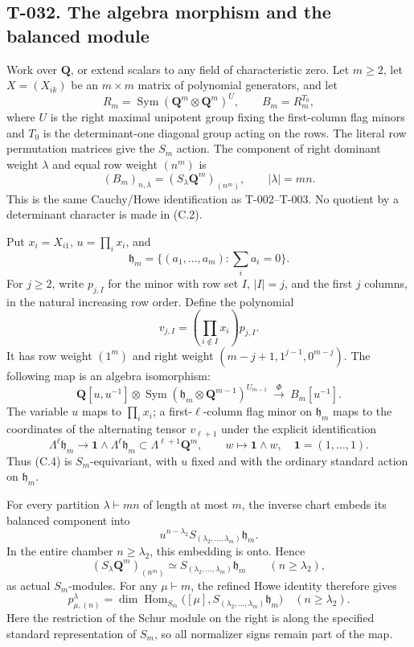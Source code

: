 \documentclass[
  10pt,
]{article}
\begin{document}
\subsection{T-032. The algebra morphism and the balanced
module}\label{t-032.-the-algebra-morphism-and-the-balanced-module}

Work over \(\mathbf Q\), or extend scalars to any field of
characteristic zero. Let \(m\ge2\), let \(X=(X_{ik})\) be an
\(m\times m\) matrix of polynomial generators, and let \[
R_m=\operatorname{Sym}(\mathbf Q^m\otimes\mathbf Q^m)^{U},
\qquad B_m=R_m^{T_0},
\tag{C.1}
\] where \(U\) is the right maximal unipotent group fixing the
first-column flag minors and \(T_0\) is the determinant-one diagonal
group acting on the rows. The literal row permutation matrices give the
\(S_m\) action. The component of right dominant weight \(\lambda\) and
equal row weight \((n^m)\) is \[
(B_m)_{n,\lambda}=(S_\lambda\mathbf Q^m)_{(n^m)},
\qquad |\lambda|=mn.
\tag{C.2}
\] This is the same Cauchy/Howe identification as T-002--T-003. No
quotient by a determinant character is made in (C.2).

Put \(x_i=X_{i1}\), \(u=\prod_i x_i\), and \[
\mathfrak h_m=\{(a_1,\ldots,a_m):\sum_i a_i=0\}.
\] For \(j\ge2\), write \(p_{j,I}\) for the minor with row set \(I\),
\(|I|=j\), and the first \(j\) columns, in the natural increasing row
order. Define the polynomial \[
v_{j,I}=\left(\prod_{i\notin I}x_i\right)p_{j,I}.
\tag{C.3}
\] It has row weight \((1^m)\) and right weight
\((m-j+1,1^{j-1},0^{m-j})\). The following map is an algebra
isomorphism: \[
\boxed{
\mathbf Q[u,u^{-1}]\otimes
\operatorname{Sym}(\mathfrak h_m\otimes\mathbf Q^{m-1})^{U_{m-1}}
\ \xrightarrow{\ \Phi\ }\ B_m[u^{-1}].}
\tag{C.4}
\] The variable \(u\) maps to \(\prod_i x_i\); a first-\(\ell\)-column
flag minor on \(\mathfrak h_m\) maps to the coordinates of the
alternating tensor \(v_{\ell+1}\) under the explicit identification \[
\Lambda^\ell\mathfrak h_m\longrightarrow
\mathbf1\wedge\Lambda^\ell\mathfrak h_m\subset\Lambda^{\ell+1}\mathbf Q^m,
\qquad w\longmapsto\mathbf1\wedge w,
\quad\mathbf1=(1,\ldots,1).
\tag{C.5}
\] Thus (C.4) is \(S_m\)-equivariant, with \(u\) fixed and with the
ordinary standard action on \(\mathfrak h_m\).

For every partition \(\lambda\vdash mn\) of length at most \(m\), the
inverse chart embeds its balanced component into \[
u^{n-\lambda_2}S_{(\lambda_2,\ldots,\lambda_m)}\mathfrak h_m.
\tag{C.6}
\] In the entire chamber \(n\ge\lambda_2\), this embedding is onto.
Hence \[
\boxed{
(S_\lambda\mathbf Q^m)_{(n^m)}
\simeq S_{(\lambda_2,\ldots,\lambda_m)}\mathfrak h_m
\qquad(n\ge\lambda_2),}
\tag{C.7}
\] as actual \(S_m\)-modules. For any \(\mu\vdash m\), the refined Howe
identity therefore gives \[
\boxed{
p_{\mu,(n)}^\lambda
=\dim\operatorname{Hom}_{S_m}
\bigl([\mu],S_{(\lambda_2,\ldots,\lambda_m)}\mathfrak h_m\bigr)
\quad(n\ge\lambda_2).}
\tag{C.8}
\] Here the restriction of the Schur module on the right is along the
specified standard representation of \(S_m\), so all normalizer signs
remain part of the map.
\end{document}

